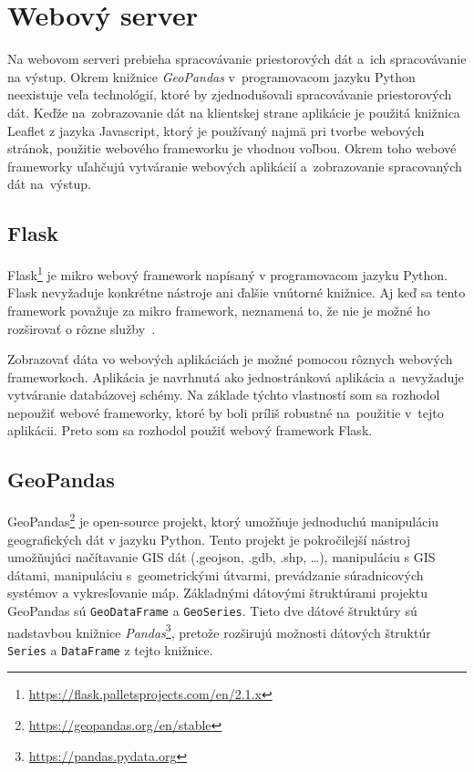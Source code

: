 \section{Webový server}
Na webovom serveri prebieha spracovávanie priestorových dát a~ich spracovávanie na výstup. Okrem knižnice \emph{GeoPandas} v~programovacom jazyku Python neexistuje veľa technológií, ktoré by zjednodušovali spracovávanie priestorových dát. Keďže na~zobrazovanie dát na klientskej strane aplikácie je použitá knižnica Leaflet z jazyka Javascript, ktorý je používaný najmä pri tvorbe webových stránok, použitie webového frameworku je vhodnou voľbou. Okrem toho webové frameworky uľahčujú vytváranie webových aplikácií a~zobrazovanie spracovaných dát na~výstup.

\subsection*{Flask}
Flask\footnote{\url{https://flask.palletsprojects.com/en/2.1.x}} je mikro webový framework napísaný v programovacom jazyku Python. Flask nevyžaduje konkrétne nástroje ani ďalšie vnútorné knižnice. Aj keď sa tento framework považuje za mikro framework, neznamená to, že nie je možné ho rozširovať o rôzne služby~\cite{Oreilly2014Flask}.

Zobrazovať dáta vo webových aplikáciách je možné pomocou rôznych webových frameworkoch. Aplikácia je navrhnutá ako jednostránková aplikácia a~nevyžaduje vytváranie databázovej schémy. Na základe týchto vlastností som sa rozhodol nepoužiť webové frameworky, ktoré by boli príliš robustné na~použitie v~tejto aplikácii. Preto som sa rozhodol použiť webový framework Flask.

\subsection*{GeoPandas}
GeoPandas\footnote{\url{https://geopandas.org/en/stable}} je open-source projekt, ktorý umožňuje jednoduchú manipuláciu geografických dát v jazyku Python. Tento projekt je pokročilejší nástroj umožňujúci načítavanie GIS dát (.geojson, .gdb, .shp, \ldots), manipuláciu s GIS dátami, manipuláciu s~geometrickými útvarmi, prevádzanie súradnicových systémov a vykresľovanie máp. Základnými dátovými štruktúrami projektu GeoPandas sú \texttt{GeoDataFrame} a \texttt{GeoSeries}. Tieto dve dátové štruktúry sú nadstavbou knižnice \emph{Pandas}\footnote{\url{https://pandas.pydata.org}}, pretože rozširujú možnosti dátových štruktúr \texttt{Series} a \texttt{DataFrame} z tejto knižnice.


